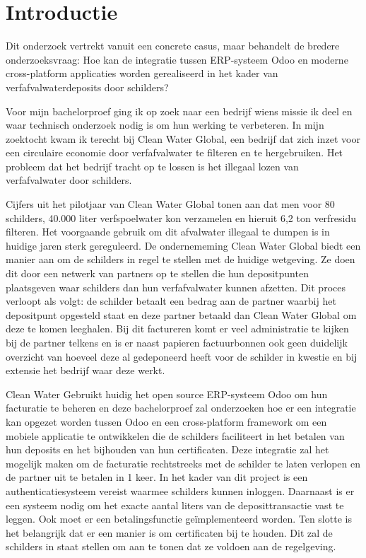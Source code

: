 \section{Introductie}%
\label{sec:introductie}

Dit onderzoek vertrekt vanuit een concrete casus, 
maar behandelt de bredere onderzoeksvraag: 
Hoe kan de integratie tussen ERP-systeem Odoo en moderne cross-platform applicaties worden gerealiseerd in het kader van verfafvalwaterdeposits door schilders?

\bigskip

Voor mijn bachelorproef ging ik op zoek naar een bedrijf wiens missie ik deel 
en waar technisch onderzoek nodig is om hun werking te verbeteren.
In mijn zoektocht kwam ik terecht bij Clean Water Global, 
een bedrijf dat zich inzet voor een circulaire economie door verfafvalwater te filteren en te hergebruiken.
Het probleem dat het bedrijf tracht op te lossen is het illegaal lozen van verfafvalwater door schilders.

Cijfers uit het pilotjaar van Clean Water Global tonen aan dat men voor 80 schilders, 40.000 liter verfspoelwater kon verzamelen en hieruit 6,2 ton verfresidu filteren.
Het voorgaande gebruik om dit afvalwater illegaal te dumpen is in huidige jaren sterk gereguleerd. 
De ondernememing Clean Water Global biedt een manier aan om de schilders in regel te stellen met de huidige wetgeving.
Ze doen dit door een netwerk van partners op te stellen die hun depositpunten plaatsgeven waar schilders dan hun verfafvalwater kunnen afzetten.
Dit proces verloopt als volgt: de schilder betaalt een bedrag aan de partner waarbij het depositpunt opgesteld staat en deze partner betaald dan Clean Water Global om deze te komen leeghalen.
Bij dit factureren komt er veel administratie te kijken bij de partner telkens en 
is er naast papieren factuurbonnen ook geen duidelijk overzicht van hoeveel deze al gedeponeerd heeft 
voor de schilder in kwestie en bij extensie het bedrijf waar deze werkt.



Clean Water Gebruikt huidig het open source ERP-systeem Odoo om hun facturatie te beheren en deze bachelorproef zal onderzoeken hoe er een integratie kan opgezet worden 
tussen Odoo en een cross-platform framework om een mobiele applicatie te ontwikkelen die de schilders faciliteert in het betalen van hun deposits en het bijhouden van hun certificaten.
Deze integratie zal het mogelijk maken om de facturatie rechtstreeks met de schilder te laten verlopen en de partner uit te betalen in 1 keer.
In het kader van dit project is een authenticatiesysteem vereist waarmee schilders kunnen inloggen. 
Daarnaast is er een systeem nodig om het exacte aantal liters van de deposittransactie vast te leggen. 
Ook moet er een betalingsfunctie geïmplementeerd worden. 
Ten slotte is het belangrijk dat er een manier is om certificaten bij te houden. 
Dit zal de schilders in staat stellen om aan te tonen dat ze voldoen aan de regelgeving.


